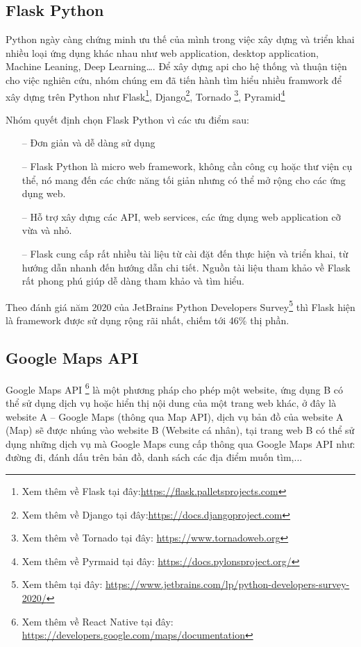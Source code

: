\subsection{Flask Python}
Python ngày càng chứng minh ưu thế của mình trong việc xây dựng và triển khai nhiều loại ứng dụng khác nhau như web application, desktop application, Machine Leaning, Deep Learning….
Để xây dựng \ac{api} cho hệ thống và thuận tiện cho việc nghiên cứu, nhóm chúng em đã tiến hành tìm hiểu nhiều framwork để xây dựng trên Python như Flask\footnote{Xem thêm về Flask tại đây:\url{https://flask.palletsprojects.com}}, Django\footnote{Xem thêm về Django tại đây:\url{https://docs.djangoproject.com}}, Tornado \footnote{Xem thêm về Tornado tại đây: \url{https://www.tornadoweb.org}}, Pyramid\footnote{Xem thêm về Pyrmaid tại đây: \url{https://docs.pylonsproject.org/}}

Nhóm quyết định chọn Flask Python vì các ưu điểm sau:
\begin{itemize}
    \item[--] Đơn giản và dễ dàng sử dụng
    \item[--] Flask Python là micro web framework, không cần công cụ hoặc thư viện cụ thể, nó mang đến các chức năng tối giản nhưng có thể mở rộng cho các ứng dụng web.
    \item[--] Hỗ trợ xây dựng các API, web services, các ứng dụng web application cỡ vừa và nhỏ.
    \item[--] Flask cung cấp rất nhiều tài liệu từ cài đặt đến thực hiện và triển khai, từ hướng dẫn nhanh đến hướng dẫn chi tiết. Nguồn tài liệu tham khảo về Flask rất phong phú giúp dễ dàng tham khảo và tìm hiểu.
\end{itemize}

Theo đánh giá năm 2020 của JetBrains Python Developers Survey\footnote{Xem thêm tại đây: \url{https://www.jetbrains.com/lp/python-developers-survey-2020/}} thì Flask hiện là framework được sử dụng rộng rãi nhất, chiếm tới 46\% thị phần.
\subsection{Google Maps API}
Google Maps API \footnote{Xem thêm về React Native tại đây: \url{https://developers.google.com/maps/documentation}} là một phương pháp cho phép một website, ứng dụng B có thể sử dụng dịch vụ hoặc hiển thị nội dung của một trang web khác, ở đây là website A – Google Maps (thông qua Map API), dịch vụ bản đồ của website A (Map) sẽ được nhúng vào website B (Website cá nhân), tại trang web B có thể sử dụng những dịch vụ mà Google Maps cung cấp thông qua Google Maps API như: đường đi, đánh dấu trên bản đồ, danh sách các địa điểm muốn tìm,...

